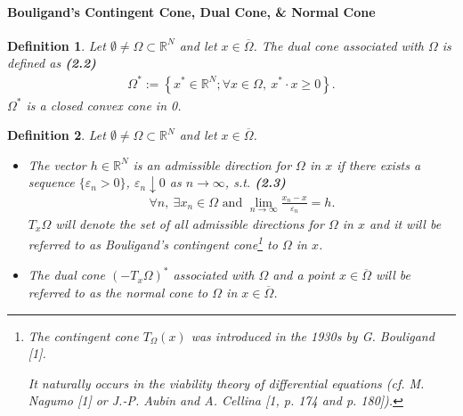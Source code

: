 \documentclass{book}
\numberwithin{equation}{section}
\newtheorem{definition}{Definition}[section]
\begin{document}
\paragraph{Bouligand's Contingent Cone, Dual Cone, \& Normal Cone}
\begin{definition}
    Let $\emptyset\ne\Omega\subset\mathbb{R}^N$ and let $x\in\overline{\Omega}$. The \emph{dual cone} associated with $\Omega$ is defined as \textbf{(2.2)}
    \begin{align*}
        \Omega^* := \left\{x^*\in\mathbb{R}^N;\forall x\in\Omega,\ x^*\cdot x\ge 0\right\}.
    \end{align*}
    $\Omega^*$ is a closed convex cone in 0.
\end{definition}

\begin{definition}
    Let $\emptyset\ne\Omega\subset\mathbb{R}^N$ and let $x\in\overline{\Omega}$.
    \begin{itemize}
        \item[(i)] The vector $h\in\mathbb{R}^N$ is an \emph{admissible direction} for $\Omega$ in $x$ if there exists a sequence $\{\varepsilon_n > 0\}$, $\varepsilon_n\downarrow 0$ as $n\to\infty$, s.t. \textbf{(2.3)}
        \begin{align*}
            \forall n,\ \exists x_n\in\Omega \mbox{ and } \lim_{n\to\infty} \frac{x_n - x}{\varepsilon_n} = h.
        \end{align*}
        $T_x\Omega$ will denote the set of all admissible directions for $\Omega$ in $x$ and it will be referred to as \emph{Bouligand's contingent cone}\footnote{The \textit{contingent cone} $T_\Omega(x)$ was introduced in the 1930s by G. Bouligand [1].
            
            It naturally occurs in the \textit{viability theory} of differential equations (cf. M. Nagumo [1] or J.-P. Aubin and A. Cellina [1, p. 174 and p. 180]).} to $\Omega$ in $x$.
        \item[(ii)] The dual cone $\left(-T_x\Omega\right)^*$ associated with $\Omega$ and a point $x\in\overline{\Omega}$ will be referred to as the \emph{normal cone} to $\Omega$ in $x\in\overline{\Omega}$.
    \end{itemize}
\end{definition}
\end{document}

